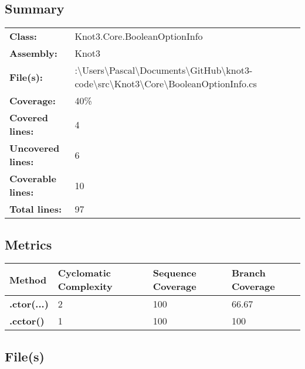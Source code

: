 \documentclass[a4paper,10pt]{article}
\begin{document}
\subsection{Summary}
\begin{longtable}[l]{ll}
\textbf{Class:} & Knot3.Core.BooleanOptionInfo\\
\textbf{Assembly:} & Knot3\\
\textbf{File(s):} & \begin{minipage}[t]{12cm}{:\textbackslash Users\textbackslash Pascal\textbackslash Documents\textbackslash GitHub\textbackslash knot3-code\textbackslash src\textbackslash Knot3\textbackslash Core\textbackslash BooleanOptionInfo.cs}\end{minipage} \\
\textbf{Coverage:} & 40\%\\
\textbf{Covered lines:} & 4\\
\textbf{Uncovered lines:} & 6\\
\textbf{Coverable lines:} & 10\\
\textbf{Total lines:} & 97\\
\end{longtable}
\subsection{Metrics}
\begin{longtable}[l]{|l|l|l|l|}
\hline
\textbf{Method} & \textbf{Cyclomatic Complexity} & \textbf{Sequence Coverage} & \textbf{Branch Coverage}\\
\hline
\textbf{.ctor(...)} & 2 & 100 & 66.67\\
\hline
\textbf{.cctor()} & 1 & 100 & 100\\
\hline
\end{longtable}
\subsection{File(s)}
\end{document}
